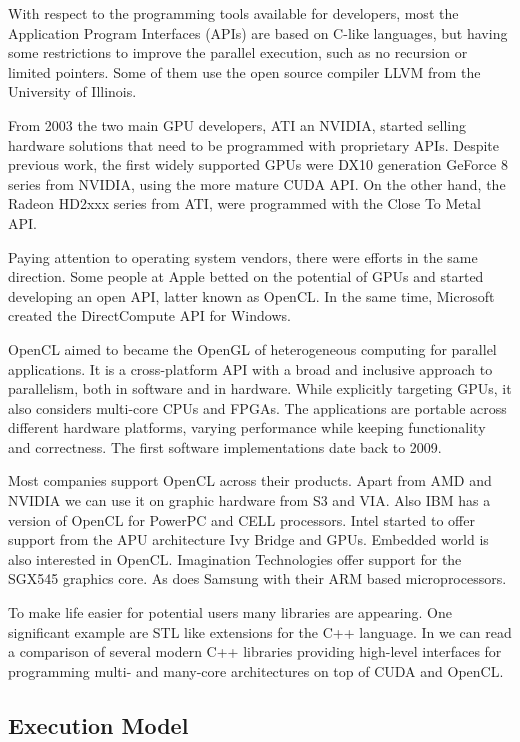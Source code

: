 \documentclass[review]{elsarticle}
\begin{document}
With respect to the programming tools available for developers, most the Application Program Interfaces (APIs) are based on C-like languages, but having some restrictions to improve the parallel execution, such as no recursion or limited pointers. Some of them use the open source compiler LLVM \cite{LLVM} from the University of Illinois.

From 2003 the two main GPU developers, ATI an NVIDIA, started selling hardware solutions that need to be programmed with proprietary APIs. Despite previous work, the first widely supported GPUs were DX10 generation GeForce 8 series from NVIDIA, using the more mature CUDA API. On the other hand, the Radeon HD2xxx series from ATI, were programmed with the Close To Metal API. 

Paying attention to operating system vendors, there were efforts in the same direction. Some people at Apple betted on the potential of GPUs and started developing an open API, latter known as OpenCL. In the same time, Microsoft created the DirectCompute API for Windows.

OpenCL aimed to became the OpenGL of heterogeneous computing for parallel applications. It is a cross-platform API with a broad and inclusive approach to parallelism, both in software and in hardware. While explicitly targeting GPUs, it also considers multi-core CPUs and FPGAs. The applications are portable across different hardware platforms, varying performance while keeping functionality and correctness. The first software implementations date back to 2009.

Most companies support OpenCL across their products. Apart from AMD and NVIDIA we can use it on graphic hardware from S3 and VIA. Also IBM has a version of OpenCL for PowerPC and CELL processors. Intel started to offer support from the APU architecture Ivy Bridge and GPUs. Embedded world is also interested in OpenCL. Imagination Technologies offer support for the SGX545 graphics core. As does Samsung with their ARM based microprocessors.

To make life easier for potential users many libraries are appearing. One significant example are STL like extensions for the C++ language. In \cite{doi:10.1137/120903683} we can read a comparison of several modern C++ libraries providing high-level interfaces for programming multi- and many-core architectures on top of CUDA and OpenCL.

\subsection{Execution Model}
\end{document}
